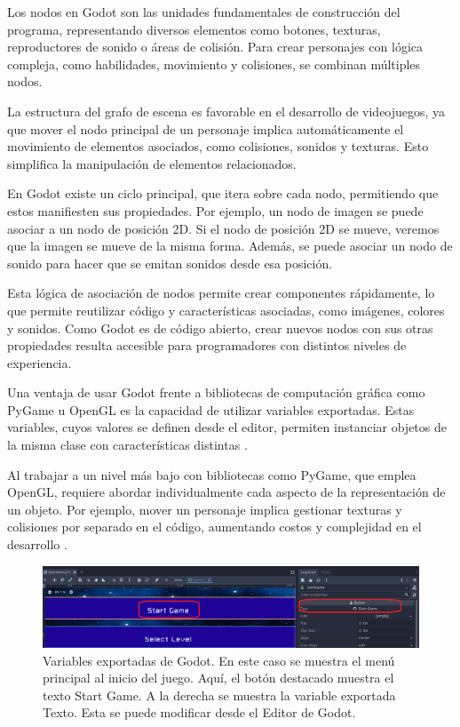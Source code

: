 Los nodos en Godot son las unidades fundamentales de construcción del programa, representando diversos elementos como botones, texturas, reproductores de sonido o áreas de colisión. Para crear personajes con lógica compleja, como habilidades, movimiento y colisiones, se combinan múltiples nodos.

La estructura del grafo de escena es favorable en el desarrollo de videojuegos, ya que mover el nodo principal de un personaje implica automáticamente el movimiento de elementos asociados, como colisiones, sonidos y texturas. Esto simplifica la manipulación de elementos relacionados.

En Godot existe un ciclo principal, que itera sobre cada nodo, permitiendo que estos manifiesten sus propiedades. Por ejemplo, un nodo de imagen se puede asociar a un nodo de posición 2D. Si el nodo de posición 2D se mueve, veremos que la imagen se mueve de la misma forma. Además, se puede asociar un nodo de sonido para hacer que se emitan sonidos desde esa posición.

Esta lógica de asociación de nodos permite crear componentes rápidamente, lo que permite reutilizar código y características asociadas, como imágenes, colores y sonidos. Como Godot es de código abierto, crear nuevos nodos con sus otras propiedades resulta accesible para programadores con distintos niveles de experiencia.

Una ventaja de usar Godot frente a bibliotecas de computación gráfica como PyGame u OpenGL es la capacidad de utilizar variables exportadas. Estas variables, cuyos valores se definen desde el editor, permiten instanciar objetos de la misma clase con características distintas \cite{GodotExportVariables}.

Al trabajar a un nivel más bajo con bibliotecas como PyGame, que emplea OpenGL, requiere abordar individualmente cada aspecto de la representación de un objeto. Por ejemplo, mover un personaje implica gestionar texturas y colisiones por separado en el código, aumentando costos y complejidad en el desarrollo \cite{GodotCollisionsAndRendering}.

\begin{figure}[h]
	\centering
	\includegraphics[scale=0.4]{imagenes/VariablesExportadas1.png}
	\caption{Variables exportadas de Godot. En este caso se muestra el menú principal al inicio del juego. Aquí, el botón destacado muestra el texto Start Game. A la derecha se muestra la variable exportada Texto. Esta se puede modificar desde el Editor de Godot.}
	\label{VariablesExportadas1}
\end{figure}


